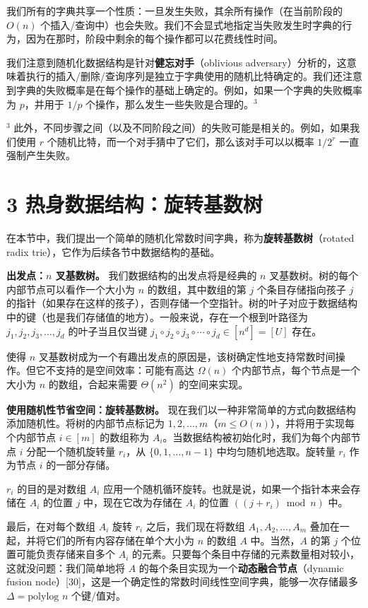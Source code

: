 \documentclass[12pt,a4paper]{ctexart}
\theoremstyle{remark}
\begin{document}
我们所有的字典共享一个性质：一旦发生失败，其余所有操作（在当前阶段的 $O(n)$ 个插入/查询中）也会失败。我们不会显式地指定当失败发生时字典的行为，因为在那时，阶段中剩余的每个操作都可以花费线性时间。

我们注意到随机化数据结构是针对\textbf{健忘对手}（oblivious adversary）分析的，这意味着执行的插入/删除/查询序列是独立于字典使用的随机比特确定的。我们还注意到字典的失败概率是在每个操作的基础上确定的。例如，如果一个字典的失败概率为 $p$，并用于 $1/p$ 个操作，那么发生一些失败是合理的。$^3$

$^3$ 此外，不同步骤之间（以及不同阶段之间）的失败可能是相关的。例如，如果我们使用 $r$ 个随机比特，而一个对手猜中了它们，那么该对手可以以概率 $1/2^r$ 一直强制产生失败。

\medskip
\section{3 热身数据结构：旋转基数树}
在本节中，我们提出一个简单的随机化常数时间字典，称为\textbf{旋转基数树}（rotated radix trie），它作为后续各节中数据结构的基础。

\textbf{出发点：$n$ 叉基数树。} 我们数据结构的出发点将是经典的 $n$ 叉基数树。树的每个内部节点可以看作一个大小为 $n$ 的数组，其中数组的第 $j$ 个条目存储指向孩子 $j$ 的指针（如果存在这样的孩子），否则存储一个空指针。树的叶子对应于数据结构中的键（也是我们存储值的地方）。一般来说，存在一个根到叶路径为 $j_1,j_2,j_3,\ldots,j_d$ 的叶子当且仅当键 $j_1\circ j_2\circ j_3\circ\cdots\circ j_d\in[n^d]=[U]$ 存在。

使得 $n$ 叉基数树成为一个有趣出发点的原因是，该树确定性地支持常数时间操作。但它不支持的是空间效率：可能有高达 $\Omega(n)$ 个内部节点，每个节点是一个大小为 $n$ 的数组，合起来需要 $\Theta(n^2)$ 的空间来实现。

\textbf{使用随机性节省空间：旋转基数树。} 现在我们以一种非常简单的方式向数据结构添加随机性。将树的内部节点标记为 $1,2,\ldots,m$（$m\leq O(n)$），并将用于实现每个内部节点 $i\in[m]$ 的数组称为 $A_i$。当数据结构被初始化时，我们为每个内部节点 $i$ 分配一个随机旋转量 $r_i$，从 $\{0,1,\ldots,n-1\}$ 中均匀随机地选取。旋转量 $r_i$ 作为节点 $i$ 的一部分存储。

$r_i$ 的目的是对数组 $A_i$ 应用一个随机循环旋转。也就是说，如果一个指针本来会存储在 $A_i$ 的位置 $j$ 中，现在它改为存储在 $A_i$ 的位置 $((j+r_i)\bmod n)$ 中。

最后，在对每个数组 $A_i$ 旋转 $r_i$ 之后，我们现在将数组 $A_1,A_2,\ldots,A_m$ 叠加在一起，并将它们的所有内容存储在单个大小为 $n$ 的数组 $A$ 中。当然，$A$ 的第 $j$ 个位置可能负责存储来自多个 $A_i$ 的元素。只要每个条目中存储的元素数量相对较小，这就没问题：我们简单地将 $A$ 的每个条目实现为一个\textbf{动态融合节点}（dynamic fusion node）[30]，这是一个确定性的常数时间线性空间字典，能够一次存储最多 $\Delta=\text{polylog } n$ 个键/值对。
\end{document}
